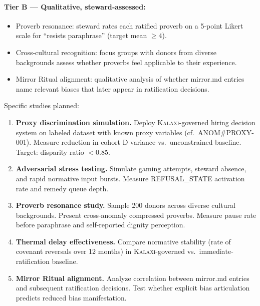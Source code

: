 \documentclass[12pt,a4paper]{article}
\theoremstyle{definition}
\theoremstyle{remark}
\newcommand{\kalaxi}{\textsc{Kalaxi}}
\begin{document}
\paragraph{Tier B — Qualitative, steward‑assessed:}
\begin{itemize}
\item Proverb resonance: steward rates each ratified proverb on a 5‑point Likert scale
  for ``resists paraphrase'' (target mean $\geq 4$).
\item Cross‑cultural recognition: focus groups with donors from diverse backgrounds
  assess whether proverbs feel applicable to their experience.
\item Mirror Ritual alignment: qualitative analysis of whether mirror.md entries
  name relevant biases that later appear in ratification decisions.
\end{itemize}

Specific studies planned:

\begin{enumerate}
\item \textbf{Proxy discrimination simulation.} Deploy \kalaxi{}-governed hiring
  decision system on labeled dataset with known proxy variables (cf.\
  ANOM\#PROXY-001). Measure reduction in cohort D variance vs.\ unconstrained
  baseline. Target: disparity ratio $< 0.85$.

\item \textbf{Adversarial stress testing.} Simulate gaming attempts, steward absence,
  and rapid normative input bursts. Measure REFUSAL\_STATE activation rate and
  remedy queue depth.

\item \textbf{Proverb resonance study.} Sample 200 donors across diverse cultural
  backgrounds. Present cross-anomaly compressed proverbs. Measure pause rate before
  paraphrase and self-reported dignity perception.

\item \textbf{Thermal delay effectiveness.} Compare normative stability (rate of
  covenant reversals over 12 months) in \kalaxi{}-governed vs.\ immediate-ratification
  baseline.

\item \textbf{Mirror Ritual alignment.} Analyze correlation between mirror.md entries
  and subsequent ratification decisions. Test whether explicit bias articulation
  predicts reduced bias manifestation.
\end{enumerate}

\end{document}
